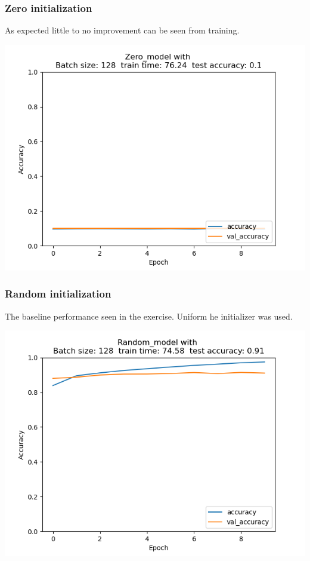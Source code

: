 \documentclass{article}
\newenvironment{Figure}
{\par\medskip\noindent\minipage{\linewidth}}
{\endminipage\par\medskip}
\begin{document}
\begin{multicols}{2}
\subsubsection{Zero initialization}
As expected little to no improvement can be seen from training.
\begin{Figure}
	\label{fig:zero_init}
	\centering
	\includegraphics[width=\linewidth]{../img_1_1_init/acc_plot_Zero_model}
\end{Figure}


\subsubsection{Random initialization}
The baseline performance seen in the exercise. Uniform he initializer was used.
\begin{Figure}
	\label{fig:random_init}
	\centering
	\includegraphics[width=\linewidth]{../img_1_1_init/acc_plot_Random_model}
\end{Figure}


\end{multicols}
\end{document}
